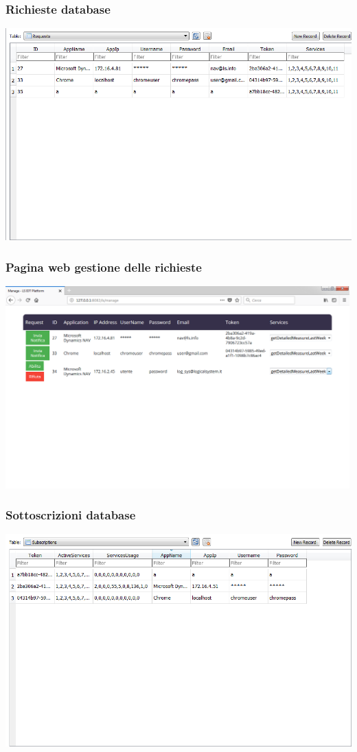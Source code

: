 \documentclass{beamer}
\begin{document}
\begin{frame}
\frametitle{Richieste database}
\includegraphics[width=1\textwidth]{images/DBPlatform2.png}
\end{frame}

\begin{frame}
\frametitle{Pagina web gestione delle richieste}
\includegraphics[width=1\textwidth]{images/managePagePlatform.png}
\end{frame}

\begin{frame}
\frametitle{Sottoscrizioni database}
\includegraphics[width=1\textwidth]{images/DBPlatform3.png}
\end{frame}
\end{document}
